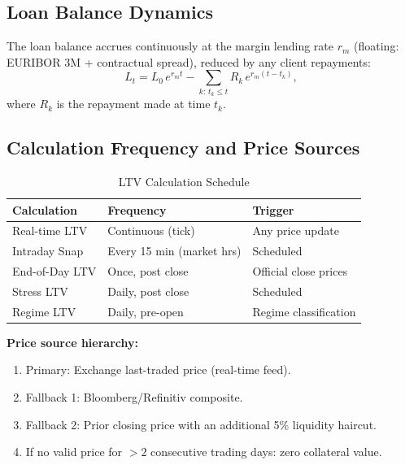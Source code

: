 \documentclass[12pt, a4paper]{article}
\newcommand{\1}{\mathbbm{1}}
\begin{document}
\subsection{Loan Balance Dynamics}

The loan balance accrues continuously at the margin lending rate $r_m$
(floating: EURIBOR 3M + contractual spread), reduced by any client repayments:
\begin{equation}
    L_t = L_0\,e^{r_m t} - \sum_{k:\,t_k \leq t} R_k\,e^{r_m(t - t_k)},
    \label{eq:loan}
\end{equation}
where $R_k$ is the repayment made at time $t_k$.

\subsection{Calculation Frequency and Price Sources}

\begin{table}[H]
\centering
\caption{LTV Calculation Schedule}
\begin{tabular}{lll}
\toprule
\textbf{Calculation} & \textbf{Frequency} & \textbf{Trigger} \\
\midrule
Real-time LTV    & Continuous (tick)          & Any price update \\
Intraday Snap    & Every 15 min (market hrs)  & Scheduled \\
End-of-Day LTV   & Once, post close           & Official close prices \\
Stress LTV       & Daily, post close          & Scheduled \\
Regime LTV       & Daily, pre-open            & Regime classification \\
\bottomrule
\end{tabular}
\end{table}

\noindent\textbf{Price source hierarchy:}
\begin{enumerate}[leftmargin=1.5em]
    \item Primary: Exchange last-traded price (real-time feed).
    \item Fallback 1: Bloomberg/Refinitiv composite.
    \item Fallback 2: Prior closing price with an additional 5\% liquidity haircut.
    \item If no valid price for $>2$ consecutive trading days: zero collateral value.
\end{enumerate}

\end{document}
